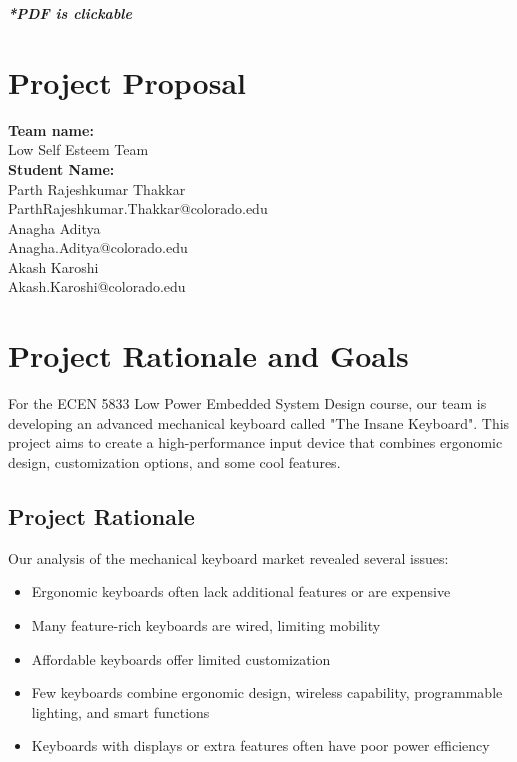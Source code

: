 \documentclass[a4paper,11pt]{article}%
\begin{document}


\pagebreak

\tableofcontents
\listoffigures
\listoftables
\vfill
\begin{center}
    \textbf{\textit{*PDF is clickable}}
\end{center}

\pagebreak

\section{Project Proposal}
\textbf{Team name:}\\
Low Self Esteem Team\\

\textbf{Student Name:}\\
Parth Rajeshkumar Thakkar\\
ParthRajeshkumar.Thakkar@colorado.edu\\

Anagha Aditya\\
Anagha.Aditya@colorado.edu\\

Akash Karoshi\\
Akash.Karoshi@colorado.edu\\


\section{Project Rationale and Goals}
For the ECEN 5833 Low Power Embedded System Design course, our team is developing an advanced mechanical keyboard called "The Insane Keyboard". This project aims to create a high-performance input device that combines ergonomic design, customization options, and some cool features.


\subsection{Project Rationale}
Our analysis of the mechanical keyboard market revealed several issues:
\begin{itemize}
    \item Ergonomic keyboards often lack additional features or are expensive
    \item Many feature-rich keyboards are wired, limiting mobility
    \item Affordable keyboards offer limited customization
    \item Few keyboards combine ergonomic design, wireless capability, programmable lighting, and smart functions
    \item Keyboards with displays or extra features often have poor power efficiency
\end{itemize}
\end{document}
